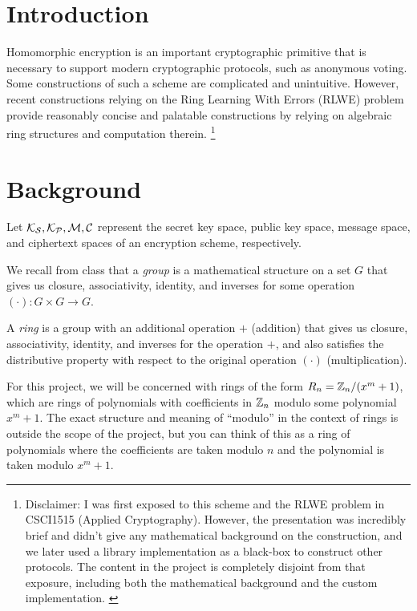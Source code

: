 \documentclass{theme}
\begin{document}
\section{Introduction}

Homomorphic encryption is an important cryptographic primitive that is necessary to support modern cryptographic protocols, such as anonymous voting. Some constructions of such a scheme are complicated and unintuitive. However, recent constructions relying on the Ring Learning With Errors (RLWE) problem provide reasonably concise and palatable constructions by relying on algebraic ring structures and computation therein.
\footnote{Disclaimer: I was first exposed to this scheme and the RLWE problem in CSCI1515 (Applied Cryptography). However, the presentation was incredibly brief and didn't give any mathematical background on the construction, and we later used a library implementation as a black-box to construct other protocols. The content in the project is completely disjoint from that exposure, including both the mathematical background and the custom implementation. \cite{csci1515}}

\section{Background}

Let $\mathcal{K_S}, \mathcal{K_P}, \mathcal{M}, \mathcal{C}$ represent the secret key space, public key space, message space, and ciphertext spaces of an encryption scheme, respectively.

We recall from class that a \textit{group} is a mathematical structure on a set $G$ that gives us closure, associativity, identity, and inverses for some operation $(\cdot): G \times G \to G$.

A \textit{ring} is a group with an additional operation $+$ (addition) that gives us closure, associativity, identity, and inverses for the operation $+$, and also satisfies the distributive property with respect to the original operation $(\cdot)$ (multiplication).

For this project, we will be concerned with rings of the form $R_n = \mathbb{Z}_n/(x^m + 1)$, which are rings of polynomials with coefficients in $\mathbb{Z}_n$ modulo some polynomial $x^m + 1$. The exact structure and meaning of ``modulo'' in the context of rings is outside the scope of the project, but you can think of this as a ring of polynomials where the coefficients are taken modulo $n$ and the polynomial is taken modulo $x^m + 1$.
\end{document}
